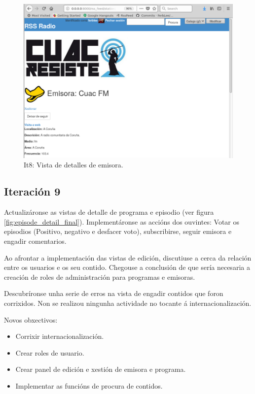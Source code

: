 \begin{figure}[h]
	\centering
	\includegraphics[scale=0.4,keepaspectratio=true]{./images/station_detail_final.png}
	\caption{It8: Vista de detalles de emisora.}
	\label{fig:station_detail_final}
\end{figure}


\subsection{Iteración 9}

Actualizáronse as vistas de detalle de programa e episodio (ver figura \ref{fig:episode_detail_final}). Implementáronse as accións dos ouvintes: Votar os episodios (Positivo, negativo e desfacer voto), subscribirse, seguir emisora e engadir comentarios.

Ao afrontar a implementación das vistas de edición, discutiuse a cerca da relación entre os usuarios e os seu contido. Chegouse a conclusión de que sería necesaria a creación de roles de administración para programas e emisoras.

Descubríronse unha serie de erros na vista de engadir contidos que foron corrixidos. Non se realizou ningunha actividade no tocante á internacionalización.

Novos obxectivos:
\begin{itemize}
	\item Corrixir internacionalización.
	\item Crear roles de usuario.
	\item Crear panel de edición e xestión de emisora e programa.
	\item Implementar as funcións de procura de contidos.
\end{itemize}

